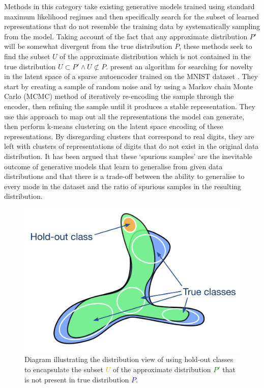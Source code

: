 Methods in this category take existing generative models trained using standard maximum likelihood regimes and then specifically search for the subset of learned representations that do not resemble the training data by systematically sampling from the model. 
Taking account of the fact that any approximate distribution $P'$ will be somewhat divergent from the true distribution $P$, these methods seek to find the subset $U$ of the approximate distribution which is not contained in the true distribution $U \subset P' \wedge U \not\subset P$. \citet{kazakcci2016digits} present an algorithm for searching for novelty in the latent space of a sparse autoencoder trained on the MNIST dataset \citep{lecun1998gradient}. 
They start by creating a sample of random noise and by using a Markov chain Monte Carlo (MCMC) method of iteratively re-encoding the sample through the encoder, then refining the sample until it produces a stable representation. 
They use this approach to map out all the representations the model can generate, then perform k-means clustering on the latent space encoding of these representations. 
By disregarding clusters that correspond to real digits, they are left with clusters of representations of digits that do not exist in the original data distribution. 
It has been argued that these `spurious samples' are the inevitable outcome of generative models that learn to generalise from given data distributions \citep{kegl2018spurious} and that there is a trade-off between the ability to generalise to every mode in the dataset and the ratio of spurious samples in the resulting distribution. 

\begin{figure}[!htbp]
    \centering
    \includegraphics[width=1\textwidth]{figures/c6_active_div/diagrams/hold_out.png}
    \caption[Novelty search over learned representations using hold-out classes]{Diagram illustrating the distribution view of using hold-out classes to encapsulate the subset \textcolor{orange}{$U$} of the approximate distribution \textcolor{green}{$P'$} that is not present in true distribution \textcolor{blue}{$P$}.}
  \label{fig:c6:novelty-search-hold-out}
  \end{figure}

